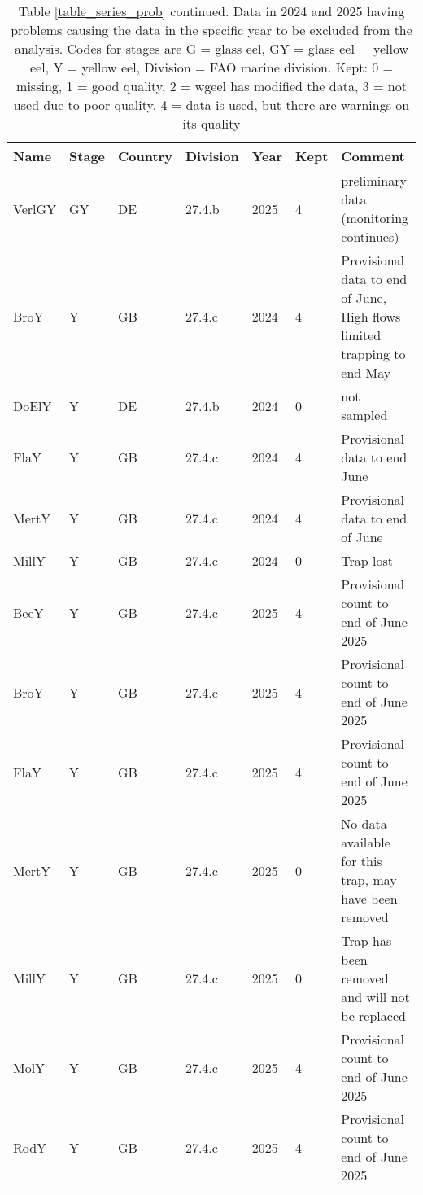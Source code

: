 \begin{table}[htbp]
\centering
\caption{Table \ref{table_series_prob} continued. Data in 2024 and 2025 having problems causing the data in the specific year to be excluded from the analysis. Codes for stages are G = glass eel, GY = glass eel + yellow eel, Y = yellow eel, Division = FAO marine division. Kept: 0 = missing, 1 = good quality,
              2 = wgeel has modified the data, 3 = not used due to poor quality, 4 =	data is used, but there are warnings on its quality} 
\label{table_series_prob2}
\begin{tabular}{p{1.5cm}p{1.5cm}p{1.5cm}p{1cm}p{1cm}p{1cm}p{8cm}}
  \hline
Name & Stage & Country & Division & Year & Kept & Comment \\ 
  \hline
VerlGY & GY & DE & 27.4.b & 2025 &   4 & preliminary data (monitoring continues) \\ 
  BroY & Y & GB & 27.4.c & 2024 &   4 & Provisional data to end of June, High flows limited trapping to end May \\ 
  DoElY & Y & DE & 27.4.b & 2024 &   0 & not sampled \\ 
  FlaY & Y & GB & 27.4.c & 2024 &   4 & Provisional data to end June \\ 
  MertY & Y & GB & 27.4.c & 2024 &   4 & Provisional data to end of June \\ 
  MillY & Y & GB & 27.4.c & 2024 &   0 & Trap lost \\ 
  BeeY & Y & GB & 27.4.c & 2025 &   4 & Provisional count to end of June 2025 \\ 
  BroY & Y & GB & 27.4.c & 2025 &   4 & Provisional count to end of June 2025 \\ 
  FlaY & Y & GB & 27.4.c & 2025 &   4 & Provisional count to end of June 2025 \\ 
  MertY & Y & GB & 27.4.c & 2025 &   0 & No data available for this trap, may have been removed \\ 
  MillY & Y & GB & 27.4.c & 2025 &   0 & Trap has been removed and will not be replaced \\ 
  MolY & Y & GB & 27.4.c & 2025 &   4 & Provisional count to end of June 2025 \\ 
  RodY & Y & GB & 27.4.c & 2025 &   4 & Provisional count to end of June 2025 \\ 
   \hline
\end{tabular}
\end{table}
